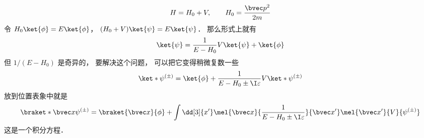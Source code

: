 
\begin{equation}
H = H_0 + V, \qquad H_0 = \frac{\bvec p^2}{2m}
\end{equation}
令 $H_0\ket{\phi} = E\ket{\phi}$， $(H_0+V)\ket{\psi}=E\ket{\psi}$． 那么形式上就有
\begin{equation}
\ket{\psi} = \frac{1}{E-H_0} V\ket{\psi} + \ket{\phi}
\end{equation}
但 $1/(E-H_0)$ 是奇异的， 要解决这个问题， 可以把它变得稍微复数一些
\begin{equation}
\ket*{\psi^{(\pm)}} = \ket{\phi} + \frac{1}{E-H_0\pm \I\varepsilon} V \ket*{\psi^{(\pm)}}
\end{equation}
放到位置表象中就是
\begin{equation}
\braket*{\bvec x}{\psi^{(\pm)}} = \braket{\bvec x}{\phi} + \int \dd[3]{x'} \mel{\bvec x}{\frac{1}{E-H_0\pm \I\varepsilon}}{\bvec x'} \mel{\bvec x'}{V}{\psi^{(\pm)}}
\end{equation}
这是一个积分方程．
